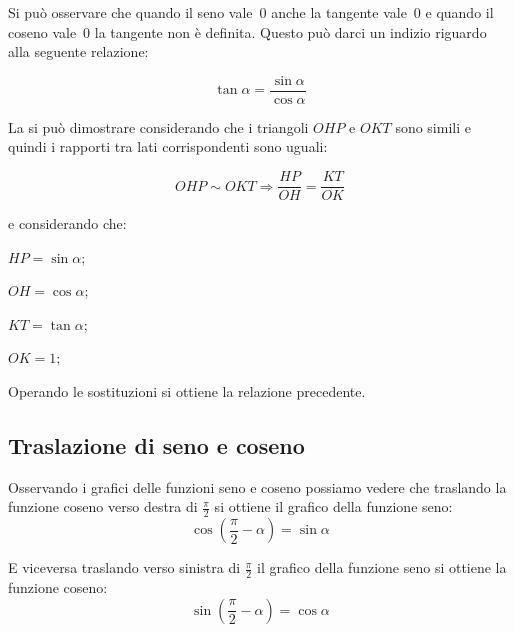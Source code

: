 Si può osservare che quando il seno vale~0 anche la tangente vale~0 e quando 
il coseno vale~0 la tangente non è definita. Questo può darci un indizio 
riguardo alla seguente relazione:

\[\tan \alpha = \frac{\sin \alpha}{\cos \alpha}\]

La si può dimostrare considerando che i triangoli $OHP$ e $OKT$ sono simili
e quindi i rapporti tra lati corrispondenti sono uguali:

\[OHP \sim OKT \Rightarrow \frac{HP}{OH} = \frac{KT}{OK}\]

\begin{minipage}{.3\textwidth}
e considerando che:
\begin{itemize*}
 \item $HP = \sin \alpha$;
 \item $OH = \cos \alpha$;
 \item $KT = \tan \alpha$;
 \item $OK = 1$;
\end{itemize*}
Operando le sostituzioni si ottiene la relazione precedente.
\end{minipage}
\begin{minipage}{.6\textwidth}
\begin{center}
 
\end{center}
\end{minipage}

\subsection{Traslazione di seno e coseno}

Osservando i grafici delle funzioni seno e coseno possiamo vedere che 
traslando
la funzione coseno verso destra di $\frac{\pi}{2}$ si ottiene il grafico 
della 
funzione seno:
\[\cos\left(\frac{\pi}{2}-\alpha\right)=\sin\alpha\]
\vspace{-6pt}
  \begin{center}
\begin{inaccessibleblock}
    
\end{inaccessibleblock}
  \end{center}
\vspace{-6pt}
E viceversa traslando verso sinistra di $\frac{\pi}{2}$ il grafico della 
funzione seno si ottiene la funzione coseno:
\[\sin\left(\frac{\pi}{2}-\alpha\right)=\cos\alpha\]

